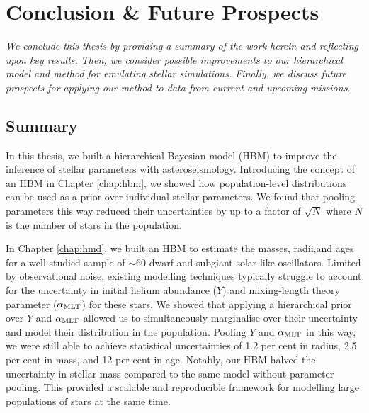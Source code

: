 %
%
%
%
%
\chapter{Conclusion \& Future Prospects}

\textit{We conclude this thesis by providing a summary of the work herein and reflecting upon key results. Then, we consider possible improvements to our hierarchical model and method for emulating stellar simulations. Finally, we discuss future prospects for applying our method to data from current and upcoming missions.}

\section*{Summary}

In this thesis, we built a hierarchical Bayesian model (HBM) to improve the inference of stellar parameters with asteroseismology. Introducing the concept of an HBM in Chapter \ref{chap:hbm}, we showed how population-level distributions can be used as a prior over individual stellar parameters. We found that pooling parameters this way reduced their uncertainties by up to a factor of \(\sqrt{N}\) where \(N\) is the number of stars in the population.

In Chapter \ref{chap:hmd}, we built an HBM to estimate the masses, radii,and ages for a well-studied sample of \(\sim 60\) dwarf and subgiant solar-like oscillators. Limited by observational noise, existing modelling techniques typically struggle to account for the uncertainty in initial helium abundance (\(Y\)) and mixing-length theory parameter (\({\alpha_\mathrm{MLT}}\)) for these stars. We showed that applying a hierarchical prior over \(Y\) and \({\alpha_\mathrm{MLT}}\) allowed us to simultaneously marginalise over their uncertainty and model their distribution in the population. Pooling \(Y\) and \({\alpha_\mathrm{MLT}}\) in this way, we were still able to achieve statistical uncertainties of 1.2 per cent in radius, 2.5 per cent in mass, and 12 per cent in age. Notably, our HBM halved the uncertainty in stellar mass compared to the same model without parameter pooling. This provided a scalable and reproducible framework for modelling large populations of stars at the same time.


